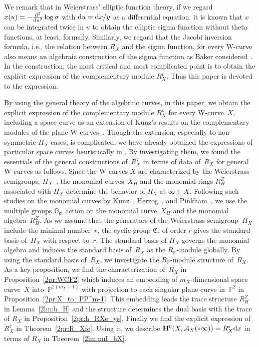 \documentclass[pdftex]{sigma}
\def\GG{{\mathbb G}}
\def\PP{{\mathbb P}}
\def\bH{{\mathbf F}}
\def\bH{{\mathbf H}}
\def\cA{{\mathcal A}}
\def\fC{{\mathfrak C}}
\def\fc{{\mathfrak c}}
\def\fm{{\mathfrak m}}
\numberwithin{equation}{section}
\begin{document}
We remark that in Weierstrass' elliptic function theory, if we regard $x(u)=-\frac{{\rm d}^2}{{\rm d} u^2}\log \sigma$ with ${\rm d}u = {\rm d}x/y$ as a differential equation, it is known that $x$ can be integrated twice in $u$ to obtain the elliptic sigma function without theta functions, at least, formally.
Similarly, we regard that the Jacobi inversion formula, i.e., the relation between $R_X$ and the sigma function, for every W-curve also means an algebraic construction of the sigma function as Baker considered~\cite{Baker97}.
In the construction, the most critical and most complicated point is to obtain the explicit expression of the complementary module $R_X^\fc$.
Thus this paper is devoted to the expression.

By using the general theory of the algebraic curves, in this paper, we obtain the explicit expression of the complementary module $R_X^\fc$ for every W-curve~$X$, including a space curve as an extension of Kunz's results on the complementary modules of the plane W-curves~\cite{Kunz2004}.
Though the extension, especially to non-symmetric $H_X$ cases, is complicated, we have already obtained the expressions of particular space curves heuristically in \cite{KMP13, KMP19, MK13}.
By investigating them, we found the essentials of the general constructions of~$R_X^\fc$ in terms of data of~$R_X$ for general W-curves as follows.
Since the W-curves $X$ are characterized by the Weierstrass semigroups, $H_X$~\cite{Wei67}, the monomial curves~$X_H$ and the monomial rings $R_H^Z$ associated with $H_X$ determine the behavior of $R_X$ at $\infty\in X$.
Following such studies on the monomial curves by Kunz~\cite{Kunz1970}, Herzog~\cite{Herzog70}, and Pinkham~\cite{Pinkham74}, we use the multiple groups $\GG_\fm$ action on the monomial curve~$X_H$ and the monomial algebra~$R_H^Z$.
As we assume that the generators of the Weierstrass semigroup~$H_X$ include the minimal number~$r$, the cyclic group $\fC_r$ of order $r$ gives the standard basis of~$H_X$ with respect to~$r$.
The standard basis of $H_X$ governs the monomial algebra and induces the standard basis of~$R_X$ as the $R_\PP$-module globally.
By using the standard basis of~$R_X$, we investigate the $R_\PP$-module structure of~$R_X$.
As a key proposition, we find the characterization of~$R_X$ in Proposition~\ref{2pr:WCF2} which induces an embedding of $m_X$-dimensional space curve~$X$ into~$\PP^{2(m_X-1)}$ with projection to each singular plane curve in~$\PP^2$ in Proposition~\ref{2pr:X_to_PP^m-1}. This embedding leads the trace structure $R_H^Z$ in Lemma~\ref{2lm:h_H} and the structure determines the dual basis with the trace of $R_X$ in Proposition~\ref{2pr:h_RXe_ys}.
Finally we find the explicit expression of~$R_X^\fc$ in Theorem~\ref{2pr:R_Xfc}.
Using it, we describe $\bH^0(X, \cA_X(*\infty))=R_X^\fc {\rm d} x$ in terms of $R_X$ in Theorem~\ref{2lm:nuI_hX}.
\end{document}
